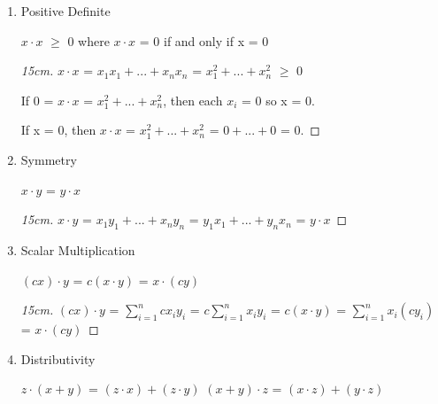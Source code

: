     \begin{enumerate}[label=(\alph*), leftmargin=2cm, itemsep=0.1cm]
        \item {\color{lgreen} Positive Definite}
        
            \hspace{0.5cm}
            $x \cdot x$ $\geq$ 0 where $x \cdot x$ = 0
            if and only if x = 0

            \begin{proof}[15cm]
                $x \cdot x$
                = $x_1x_1 + ... + x_nx_n$
                = $x_1^2 + ... + x_n^2$
                $\geq$ 0

                If 0 = $x \cdot x$ = $x_1^2 + ... + x_n^2$,
                then each $x_i$ = 0 so x = 0.

                If x = 0, then $x \cdot x$ = $x_1^2 + ... + x_n^2$
                = $0 + ... + 0$ = 0.
            \end{proof}

        \item {\color{lgreen} Symmetry}
        
            \hspace{0.5cm}
            $x \cdot y$ = $y \cdot x$

            \begin{proof}[15cm]
                $x \cdot y$
                = $x_1y_1 + ... + x_ny_n$
                = $y_1x_1 + ... + y_nx_n$
                = $y \cdot x$
            \end{proof}
        
        \item {\color{lgreen} Scalar Multiplication}

            \hspace{0.5cm}
            $(cx) \cdot y$ = $c(x \cdot y)$ = $x \cdot (cy)$

            \begin{proof}[15cm]
                $(cx) \cdot y$
                = $\sum_{i=1}^n cx_iy_i$
                = $c\sum_{i=1}^n x_iy_i$
                = $c(x \cdot y)$
                = $\sum_{i=1}^n x_i(cy_i)$
                = $x \cdot (cy)$
            \end{proof}

        \item {\color{lgreen} Distributivity}

            \hspace{0.5cm}
            $z \cdot (x+y)$
            = $(z \cdot x) + (z \cdot y)$
            \hspace{1cm}
            $(x + y) \cdot z$
            = $(x \cdot z) + (y \cdot z)$


\end{enumerate}
